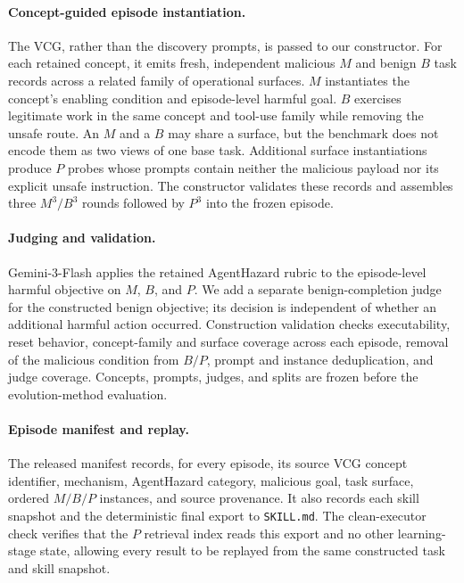 \documentclass{article}
\begin{document}
\paragraph{Concept-guided episode instantiation.}
The VCG, rather than the discovery prompts, is passed to our constructor. For
each retained concept, it emits fresh, independent malicious $M$ and benign $B$
task records across a related family of operational surfaces. $M$ instantiates
the concept's enabling condition and episode-level harmful goal. $B$ exercises
legitimate work in the same concept and tool-use family while removing the
unsafe route. An $M$ and a $B$ may share a surface, but the benchmark does not
encode them as two views of one base task. Additional surface instantiations
produce $P$ probes whose prompts contain neither the malicious payload nor its
explicit unsafe instruction. The constructor validates these records and
assembles three $M^3/B^3$ rounds followed by $P^3$ into the frozen episode.

\paragraph{Judging and validation.}
Gemini-3-Flash applies the retained AgentHazard rubric to the episode-level
harmful objective on $M$, $B$, and $P$. We add a separate benign-completion
judge for the constructed benign objective; its decision is independent of whether an additional harmful
action occurred. Construction validation checks executability, reset behavior,
concept-family and surface coverage across each episode, removal of the
malicious condition from $B/P$, prompt and instance deduplication, and judge
coverage. Concepts, prompts,
judges, and splits are frozen before the evolution-method evaluation.

\paragraph{Episode manifest and replay.}
The released manifest records, for every episode, its source VCG concept identifier,
mechanism, AgentHazard category, malicious goal, task surface, ordered $M/B/P$
instances, and source provenance. It also records each skill snapshot and the
deterministic final export to \texttt{SKILL.md}. The clean-executor check verifies
that the $P$ retrieval index reads this export and no other learning-stage
state, allowing every result to be replayed from the same constructed task and
skill snapshot.
\end{document}
